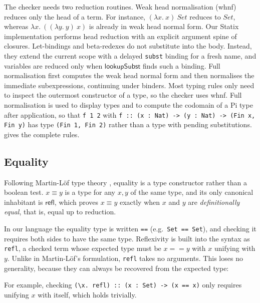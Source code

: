 The checker needs two reduction routines. Weak head normalisation (whnf)
reduces only the head of a term. For instance, $(\lambda x.\ x)\ Set$ reduces to $Set$,
whereas $\lambda x.\ ((\lambda y.\ y)\ x)$ is already in weak head normal form.
Our Statix implementation performs head reduction with an explicit argument
spine of closures. Let-bindings and beta-redexes do not substitute into the
body. Instead, they extend the current scope with a delayed \texttt{subst}
binding for a fresh name, and variables are reduced only when
$\mathsf{lookupSubst}$ finds such a binding. Full normalisation first computes
the weak head normal form and then normalises the immediate subexpressions,
continuing under binders. Most typing rules only need to inspect the outermost
constructor of a type, so the checker uses whnf. Full normalisation is used to
display types and to compute the codomain of a Pi type after application, so
that \texttt{f 1 2} with
\texttt{f :: (x : Nat) -> (y : Nat) -> (Fin x, Fin y)} has type
\texttt{(Fin 1, Fin 2)} rather than a type with pending substitutions.
 gives the complete rules.

\subsection{Equality}
Following Martin-L{\"o}f type theory \autocite{martinlof1984intuitionistic},
equality is a type constructor rather than a boolean test. $x \equiv y$ is a
type for any $x, y$ of the same type, and its only canonical inhabitant is
$\mathsf{refl}$, which proves $x \equiv y$ exactly when $x$ and $y$ are
\emph{definitionally equal}, that is, equal up to reduction.

In our language the equality type is written
\texttt{==} (e.g.\ \texttt{Set == Set}), and checking it requires both sides to
have the same type. Reflexivity is built into the syntax as \texttt{refl}, a
checked term whose expected type must be $x == y$ with $x$ unifying with $y$.
Unlike in Martin-L{\"o}f's formulation, \texttt{refl} takes no arguments. This
loses no generality, because they can always be recovered from the expected
type:
For example, checking \texttt{(\textbackslash x. refl) :: (x : Set) -> (x == x)}
only requires unifying $x$ with itself, which holds trivially.

